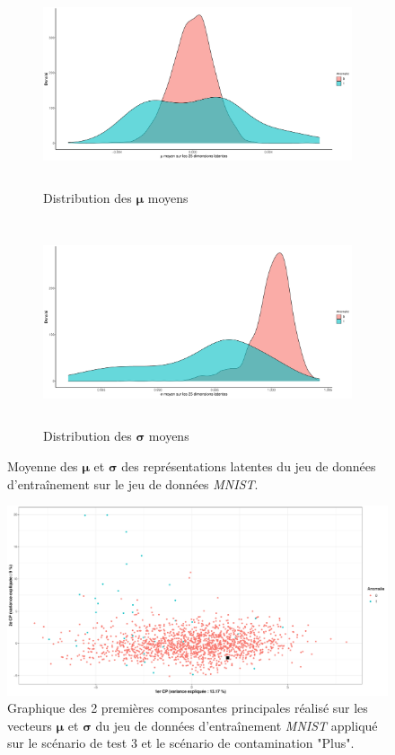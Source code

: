 \begin{figure}[H]
	\centering
	\begin{subfigure}{12cm}
		\centering\includegraphics[width=12cm, height=6cm]{images/latent_stats/plot_mu_mnist}
		\caption{Distribution des $\boldsymbol{\mu}$ moyens}
	\end{subfigure}
	\begin{subfigure}{12cm}
		\centering\includegraphics[width=12cm, height=6cm]{images/latent_stats/plot_sigma_mnist}
		\caption{Distribution des $\boldsymbol{\sigma}$ moyens}
	\end{subfigure}
	\caption{Moyenne des $\boldsymbol{\mu}$ et $\boldsymbol{\sigma}$ des représentations latentes du jeu de données d'entraînement sur le jeu de données \textit{MNIST}.}
	\label{fig:mnist_latent_stats}
\end{figure}

\begin{figure}[htb]
	\centering
	\centering\includegraphics[width=\linewidth]{images/plot_pca_mnist}
	\caption{Graphique des 2 premières composantes principales réalisé sur les vecteurs $\boldsymbol{\mu}$ et $\boldsymbol{\sigma}$ du jeu de données d'entraînement \textit{MNIST} appliqué sur le scénario de test 3 et le scénario de contamination "Plus".}
	\label{fig:pca_mnist}
\end{figure}

